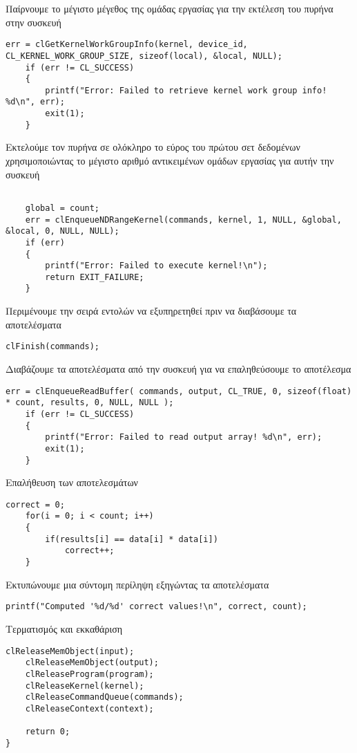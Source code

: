 Παίρνουμε το μέγιστο μέγεθος της ομάδας εργασίας για την εκτέλεση του πυρήνα στην συσκευή
\begin{lstlisting}[basicstyle=\scriptsize]
    err = clGetKernelWorkGroupInfo(kernel, device_id, CL_KERNEL_WORK_GROUP_SIZE, sizeof(local), &local, NULL);
    if (err != CL_SUCCESS)
    {
        printf("Error: Failed to retrieve kernel work group info! %d\n", err);
        exit(1);
    }
\end{lstlisting}
Εκτελούμε τον πυρήνα σε ολόκληρο το εύρος του πρώτου σετ δεδομένων χρησιμοποιώντας το μέγιστο αριθμό αντικειμένων ομάδων εργασίας για αυτήν την συσκευή
\begin{lstlisting}[basicstyle=\scriptsize]
  
    global = count;
    err = clEnqueueNDRangeKernel(commands, kernel, 1, NULL, &global, &local, 0, NULL, NULL);
    if (err)
    {
        printf("Error: Failed to execute kernel!\n");
        return EXIT_FAILURE;
    }
\end{lstlisting}
Περιμένουμε την σειρά εντολών να εξυπηρετηθεί πριν να διαβάσουμε τα αποτελέσματα
\begin{lstlisting}[basicstyle=\scriptsize]
    clFinish(commands);
\end{lstlisting}
Διαβάζουμε τα αποτελέσματα από την συσκευή για να επαληθεύσουμε το αποτέλεσμα
\begin{lstlisting}[basicstyle=\scriptsize]
    err = clEnqueueReadBuffer( commands, output, CL_TRUE, 0, sizeof(float) * count, results, 0, NULL, NULL );  
    if (err != CL_SUCCESS)
    {
        printf("Error: Failed to read output array! %d\n", err);
        exit(1);
    }
\end{lstlisting}
Επαλήθευση των αποτελεσμάτων
\begin{lstlisting}[basicstyle=\scriptsize]
    correct = 0;
    for(i = 0; i < count; i++)
    {
        if(results[i] == data[i] * data[i])
            correct++;
    }
\end{lstlisting}
Εκτυπώνουμε μια σύντομη περίληψη εξηγώντας τα αποτελέσματα
\begin{lstlisting}[basicstyle=\scriptsize]
    printf("Computed '%d/%d' correct values!\n", correct, count);
\end{lstlisting}
Τερματισμός και εκκαθάριση
\begin{lstlisting}[basicstyle=\scriptsize]
    clReleaseMemObject(input);
    clReleaseMemObject(output);
    clReleaseProgram(program);
    clReleaseKernel(kernel);
    clReleaseCommandQueue(commands);
    clReleaseContext(context);
 
    return 0;
}
\end{lstlisting}

